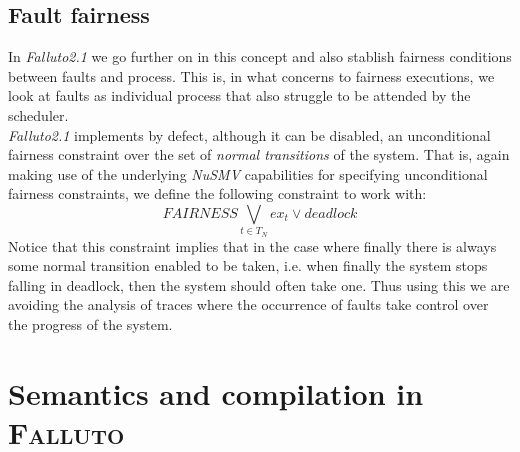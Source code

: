 \documentclass[12pt]{llncs2e/llncs}
\newcommand{\falluto}{\mbox{\textsc{Falluto}}}
\begin{document}
\subsection{Fault fairness}\label{fault fairness}
In \mbox{\textit{Falluto2.1}} we go further on in this concept and also 
stablish fairness conditions between faults and process. This is, in what
concerns to fairness executions, we look at faults as individual process
that also struggle to be attended by the scheduler.\\
\mbox{\textit{Falluto2.1}} implements by defect, although it can be disabled, an unconditional fairness
constraint over the set of \textit{normal transitions} of the system. That
is, again making use of the underlying \mbox{\textit{NuSMV}} capabilities for
specifying unconditional fairness constraints, we define the following
constraint to work with: $$FAIRNESS \bigvee_{t \in T_N} ex_t \vee deadlock$$
Notice that this constraint implies that in the case where finally there is always some
normal transition enabled to be taken, i.e. when finally the system stops falling in deadlock, then the system should often take one.
Thus using this we are avoiding the analysis of traces where the occurrence of faults take
control over the progress of the system. 


\section{Semantics and compilation in \falluto}\label{compilation}
\end{document}

